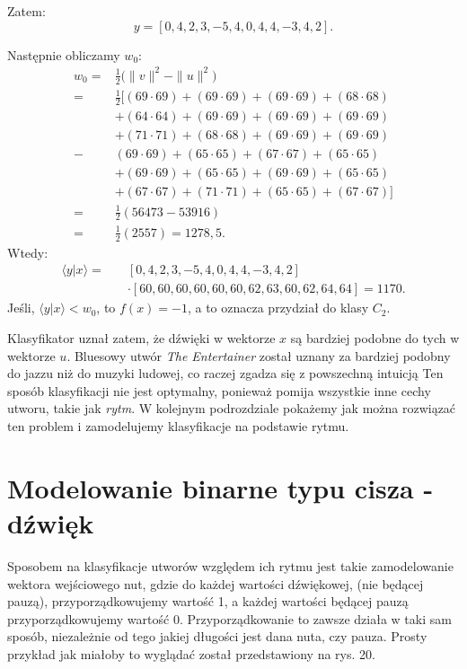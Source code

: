 Zatem:
\begin{equation*}
y =  [0, 4, 2, 3, -5, 4, 0, 4, 4, -3, 4, 2].
\end{equation*}

Następnie obliczamy $w_{0}$:
\begin{align*}
w_{0} = &  \frac{1}{2} \big(\|v\|^{2} - \|u\|^{2}\big)  \\
= & \frac{1}{2}[(69 \cdot 69) + (69 \cdot 69) + (69 \cdot 69) + (68 \cdot 68) \\
 & + (64 \cdot 64) + (69 \cdot 69) + (69 \cdot 69) + (69 \cdot 69) \\
 & + (71 \cdot 71) + (68 \cdot 68)  + (69 \cdot 69) + (69 \cdot 69) \\
 - & (69 \cdot 69) + (65 \cdot 65) + (67 \cdot 67) + (65 \cdot 65) \\
 & + (69 \cdot 69) + (65 \cdot 65) + (69 \cdot 69) + (65 \cdot 65) \\
 & + (67 \cdot 67) + (71 \cdot 71) + (65 \cdot 65) + (67 \cdot 67)] \\
 = & \frac{1}{2}(56473 - 53916) \\
 = & \frac{1}{2}(2557) = 1278,5.
\end{align*}
Wtedy:
\begin{align*}
\big \langle y|x  \big \rangle  = \quad 
& [0, 4, 2, 3, -5, 4, 0, 4, 4, -3, 4, 2] \\ 
&\cdot
[60,60,60,60,60,60,62,63,60,62,64,64] 
= 1170.
\end{align*}
Jeśli, $\big \langle y|x \big \rangle < w_{0}$, to $f(x) = -1$, a to oznacza przydział do klasy $C_{2}$.

Klasyfikator uznał zatem, że dźwięki w wektorze $x$ są bardziej podobne do tych w wektorze $u$. Bluesowy utwór \textit{The Entertainer} został uznany za bardziej podobny do jazzu niż do muzyki ludowej, co raczej zgadza się z powszechną intuicją Ten sposób klasyfikacji nie jest optymalny, ponieważ pomija wszystkie inne cechy utworu, takie jak \textit{rytm}. W kolejnym podrozdziale pokażemy jak można rozwiązać ten problem i zamodelujemy klasyfikacje na podstawie rytmu.

\section{Modelowanie binarne typu cisza - dźwięk}

Sposobem na klasyfikacje utworów względem ich rytmu jest takie zamodelowanie wektora wejściowego nut, gdzie do każdej wartości dźwiękowej, (nie będącej pauzą), przyporządkowujemy wartość 1, a każdej wartości będącej pauzą przyporządkowujemy wartość 0. Przyporządkowanie to zawsze działa w taki sam sposób, niezależnie od tego jakiej długości jest dana nuta, czy pauza. Prosty przykład jak miałoby to wyglądać został przedstawiony na rys. 20.

